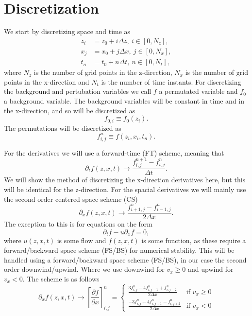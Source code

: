 \documentclass{article}
\begin{document}
\section{Discretization}
We start by discretizing space and time as
\begin{align}
    z_i &= z_0 + i\Delta z,\ i\in[0,N_z], \\ 
    x_j &= x_0 + j\Delta x,\ j\in[0,N_x],\\ 
    t_n &= t_0 + n\Delta t,\ n\in[0,N_t],
\end{align}
where $N_z$ is the number of grid points in the z-direction, $N_x$ is the number of grid points in the x-direction and $N_t$ is the number of time instants. For discretizing the background and pertubation variables we call $f$ a permutated variable and $f_0$ a background variable. The background variables will be constant in time and in the x-direction, and so will be discretized as
\begin{equation}
    f_{0,i}\equiv f_0(z_i).
\end{equation}
The permutations will be discretized as
\begin{equation}
    f_{i,j}^{n}\equiv f(z_i, x_i, t_n).
\end{equation}

For the derivatives we will use a forward-time (FT) scheme, meaning that
\begin{equation}
    \partial_t f(z,x,t) \rightarrow \frac{f_{i,j}^{n+1}-f_{i,j}^n}{\Delta t}.
\end{equation}
We will show the method of discretizing the x-direction derivatives here, but this will be identical for the z-direction. For the spacial derivatives we will mainly use the second order centered space scheme (CS)
\begin{equation}
    \partial_x f(z,x,t) \rightarrow \frac{f_{i+1,j}^n-f_{i-1,j}^n}{2\Delta x}.
\end{equation}
The exception to this is for equations on the form
\begin{equation}
    \partial_t f - u\partial_x f=0,
\end{equation}
where $u(z,x,t)$ is some flow and $f(z,x,t)$ is some function, as these require a forward/backward space scheme (FS/BS) for numerical stability. This will be handled using a forward/backward space scheme (FS/BS), in our case the second order downwind/upwind. Where we use downwind for $v_x \geq 0$ and upwind for $v_x<0$. The scheme is as follows
\begin{equation}
    \partial_x f(z,x,t) \rightarrow \left[\frac{\partial f}{\partial x} \right]_{i,j}^n= 
    \begin{cases} 
        \frac{3f_{i,j}^n-4f_{i,j-1}^n+f_{i,j-2}^n}{2\Delta x} & \text{if } v_x \geq 0 \\
        \frac{-3f_{i,j}^n+4f_{i,j+1}^n-f_{i,j+2}^n}{2\Delta x} & \text{if } v_x < 0 
    \end{cases}
\end{equation}
\end{document}
